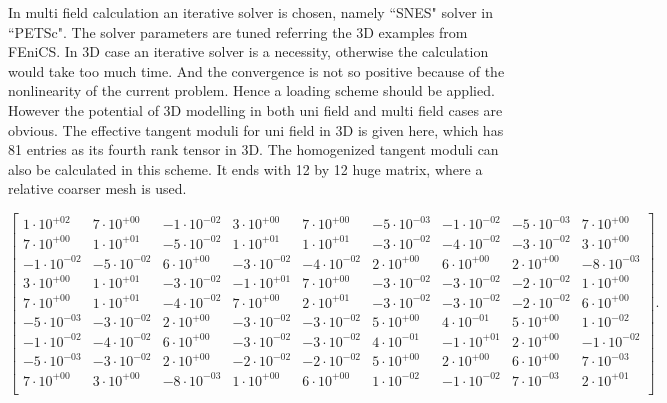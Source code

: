 In multi field calculation an iterative solver is chosen, namely ``SNES" solver in ``PETSc". The solver parameters are tuned referring the 3D examples from FEniCS. In 3D case an iterative solver is a necessity, otherwise the calculation would take too much time. And the convergence is not so positive because of the nonlinearity of the current problem. Hence a loading scheme should be applied. However the potential of 3D modelling in both uni field and multi field cases are obvious. The effective tangent moduli for uni field in 3D is given here, which has 81 entries as its fourth rank tensor in 3D. The homogenized tangent moduli can also be calculated in this scheme. It ends with 12 by 12 huge matrix, where a relative coarser mesh is used.
\begin{center}
\[
\begin{bmatrix}
1 \cdot 10^{+02} & 7 \cdot 10^{+00} & -1 \cdot 10^{-02} & 3 \cdot 10^{+00} & 7 \cdot 10^{+00} & -5 \cdot 10^{-03} & -1 \cdot 10^{-02} & -5 \cdot 10^{-03} & 7 \cdot 10^{+00}\\ 
7 \cdot 10^{+00} & 1 \cdot 10^{+01} & -5 \cdot 10^{-02} & 1 \cdot 10^{+01} & 1 \cdot 10^{+01} & -3 \cdot 10^{-02} & -4 \cdot 10^{-02} & -3 \cdot 10^{-02} & 3 \cdot 10^{+00}\\ 
-1 \cdot 10^{-02} & -5 \cdot 10^{-02} & 6 \cdot 10^{+00} & -3 \cdot 10^{-02} & -4 \cdot 10^{-02} & 2 \cdot 10^{+00} & 6 \cdot 10^{+00} & 2 \cdot 10^{+00} & -8 \cdot 10^{-03}\\ 
3 \cdot 10^{+00} & 1 \cdot 10^{+01} & -3 \cdot 10^{-02} & -1 \cdot 10^{+01} & 7 \cdot 10^{+00} & -3 \cdot 10^{-02} & -3 \cdot 10^{-02} & -2 \cdot 10^{-02} & 1 \cdot 10^{+00}\\ 
7 \cdot 10^{+00} & 1 \cdot 10^{+01} & -4 \cdot 10^{-02} & 7 \cdot 10^{+00} & 2 \cdot 10^{+01} & -3 \cdot 10^{-02} & -3 \cdot 10^{-02} & -2 \cdot 10^{-02} & 6 \cdot 10^{+00}\\ 
-5 \cdot 10^{-03} & -3 \cdot 10^{-02} & 2 \cdot 10^{+00} & -3 \cdot 10^{-02} & -3 \cdot 10^{-02} & 5 \cdot 10^{+00} & 4 \cdot 10^{-01} & 5 \cdot 10^{+00} & 1 \cdot 10^{-02}\\ 
-1 \cdot 10^{-02} & -4 \cdot 10^{-02} & 6 \cdot 10^{+00} & -3 \cdot 10^{-02} & -3 \cdot 10^{-02} & 4 \cdot 10^{-01} & -1 \cdot 10^{+01} & 2 \cdot 10^{+00} & -1 \cdot 10^{-02}\\ 
-5 \cdot 10^{-03} & -3 \cdot 10^{-02} & 2 \cdot 10^{+00} & -2 \cdot 10^{-02} & -2 \cdot 10^{-02} & 5 \cdot 10^{+00} & 2 \cdot 10^{+00} & 6 \cdot 10^{+00} & 7 \cdot 10^{-03}\\ 
7 \cdot 10^{+00} & 3 \cdot 10^{+00} & -8 \cdot 10^{-03} & 1 \cdot 10^{+00} & 6 \cdot 10^{+00} & 1 \cdot 10^{-02} & -1 \cdot 10^{-02} & 7 \cdot 10^{-03} & 2 \cdot 10^{+01}\\ 
\end{bmatrix}.
\]

\end{center}


